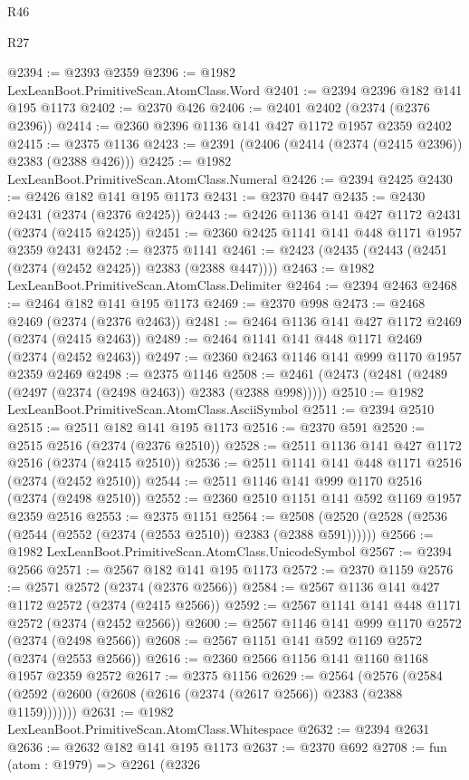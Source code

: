 \begin{lexlean}{R46}
\begin{lexlean}{R27}
\begin{coremodule}
{{{{{{{{{{{{{{{{{{{{{{{{{{{{{{{{{{{{{{{{{{{{{{{{{{{{{{{{{{{{{{@2394 := @2393 @2359
@2396 := @1982 LexLeanBoot.PrimitiveScan.AtomClass.Word
@2401 := @2394 @2396 @182 @141 @195 @1173
@2402 := @2370 @426
@2406 := @2401 @2402 (@2374 (@2376 @2396))
@2414 := @2360 @2396 @1136 @141 @427 @1172 @1957 @2359 @2402
@2415 := @2375 @1136
@2423 := @2391 (@2406 (@2414 (@2374 (@2415 @2396)) @2383 (@2388 @426)))
@2425 := @1982 LexLeanBoot.PrimitiveScan.AtomClass.Numeral
@2426 := @2394 @2425
@2430 := @2426 @182 @141 @195 @1173
@2431 := @2370 @447
@2435 := @2430 @2431 (@2374 (@2376 @2425))
@2443 := @2426 @1136 @141 @427 @1172 @2431 (@2374 (@2415 @2425))
@2451 := @2360 @2425 @1141 @141 @448 @1171 @1957 @2359 @2431
@2452 := @2375 @1141
@2461 := @2423 (@2435 (@2443 (@2451 (@2374 (@2452 @2425)) @2383 (@2388 @447))))
@2463 := @1982 LexLeanBoot.PrimitiveScan.AtomClass.Delimiter
@2464 := @2394 @2463
@2468 := @2464 @182 @141 @195 @1173
@2469 := @2370 @998
@2473 := @2468 @2469 (@2374 (@2376 @2463))
@2481 := @2464 @1136 @141 @427 @1172 @2469 (@2374 (@2415 @2463))
@2489 := @2464 @1141 @141 @448 @1171 @2469 (@2374 (@2452 @2463))
@2497 := @2360 @2463 @1146 @141 @999 @1170 @1957 @2359 @2469
@2498 := @2375 @1146
@2508 := @2461 (@2473 (@2481 (@2489 (@2497 (@2374 (@2498 @2463)) @2383 (@2388 @998)))))
@2510 := @1982 LexLeanBoot.PrimitiveScan.AtomClass.AsciiSymbol
@2511 := @2394 @2510
@2515 := @2511 @182 @141 @195 @1173
@2516 := @2370 @591
@2520 := @2515 @2516 (@2374 (@2376 @2510))
@2528 := @2511 @1136 @141 @427 @1172 @2516 (@2374 (@2415 @2510))
@2536 := @2511 @1141 @141 @448 @1171 @2516 (@2374 (@2452 @2510))
@2544 := @2511 @1146 @141 @999 @1170 @2516 (@2374 (@2498 @2510))
@2552 := @2360 @2510 @1151 @141 @592 @1169 @1957 @2359 @2516
@2553 := @2375 @1151
@2564 := @2508 (@2520 (@2528 (@2536 (@2544 (@2552 (@2374 (@2553 @2510)) @2383 (@2388 @591))))))
@2566 := @1982 LexLeanBoot.PrimitiveScan.AtomClass.UnicodeSymbol
@2567 := @2394 @2566
@2571 := @2567 @182 @141 @195 @1173
@2572 := @2370 @1159
@2576 := @2571 @2572 (@2374 (@2376 @2566))
@2584 := @2567 @1136 @141 @427 @1172 @2572 (@2374 (@2415 @2566))
@2592 := @2567 @1141 @141 @448 @1171 @2572 (@2374 (@2452 @2566))
@2600 := @2567 @1146 @141 @999 @1170 @2572 (@2374 (@2498 @2566))
@2608 := @2567 @1151 @141 @592 @1169 @2572 (@2374 (@2553 @2566))
@2616 := @2360 @2566 @1156 @141 @1160 @1168 @1957 @2359 @2572
@2617 := @2375 @1156
@2629 := @2564
    (@2576 (@2584 (@2592 (@2600 (@2608 (@2616 (@2374 (@2617 @2566)) @2383 (@2388 @1159)))))))
@2631 := @1982 LexLeanBoot.PrimitiveScan.AtomClass.Whitespace
@2632 := @2394 @2631
@2636 := @2632 @182 @141 @195 @1173
@2637 := @2370 @692
@2708 := fun (atom : @1979) =>
  @2261
    (@2326
}}}}}}}}}}}}}}}}}}}}}}}}}}}}}}}}}}}}}}}}}}}}}}}}}}}}}}}}}}}}}}
\end{coremodule}
\end{lexlean}
\end{lexlean}
